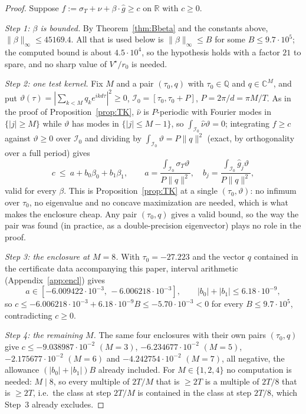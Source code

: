 \documentclass[11pt]{amsart}
\theoremstyle{definition}
\theoremstyle{remark}
\newcommand{\C}{\mathbb C}
\newcommand{\R}{\mathbb R}
\newcommand{\Q}{\mathbb Q}
\newcommand{\sT}{\sigma_T}
\newcommand{\gh}[1]{\widehat g_{#1}}
\newcommand{\nuh}{\widehat\nu}
\begin{document}
\begin{proof}
Suppose $f:=\sT+\nuh+\beta\cdot\widehat g\ge c$ on $\R$ with $c\ge0$.

\emph{Step 1: $\beta$ is bounded.} By Theorem~\ref{thm:Bbeta} and the constants above,
$\|\beta\|_\infty\le45169.4$. All that is used below is $\|\beta\|_\infty\le B$ for some
$B\le9.7\cdot10^5$; the computed bound is about $4.5\cdot10^4$, so the hypothesis holds with a
factor $21$ to spare, and no sharp value of $V^\star/r_0$ is needed.

\emph{Step 2: one test kernel.} Fix $M$ and a pair $(\tau_0,q)$ with $\tau_0\in\Q$ and
$q\in\C^M$, and put $\vartheta(\tau)=|\sum_{k<M}q_ke^{ikd\tau}|^2\ge0$, $\mathcal I_0=[\tau_0,\tau_0+P]$,
$P=2\pi/d=\pi M/T$. As in the proof of Proposition~\ref{prop:TK}, $\nuh$ is $P$-periodic with Fourier
modes in $\{|j|\ge M\}$ while $\vartheta$ has modes in $\{|j|\le M-1\}$, so $\int_{\mathcal I_0}\nuh\vartheta=0$;
integrating $f\ge c$ against $\vartheta\ge0$ over $\mathcal I_0$ and dividing by $\int_{\mathcal I_0}\vartheta=P\|q\|^2$ (exact,
by orthogonality over a full period) gives
\[
c\ \le\ a+b_0\beta_0+b_1\beta_1,\qquad a=\frac{\int_{\mathcal I_0}\sT\vartheta}{P\|q\|^2},\quad
b_j=\frac{\int_{\mathcal I_0}\gh j\vartheta}{P\|q\|^2},
\]
valid for every $\beta$. This is Proposition~\ref{prop:TK} at a single $(\tau_0,\vartheta)$: no
infimum over $\tau_0$, no eigenvalue and no concave maximization are needed, which is what makes the
enclosure cheap. Any pair $(\tau_0,q)$ gives a valid bound, so the way the pair was found (in
practice, as a double-precision eigenvector) plays no role in the proof.

\emph{Step 3: the enclosure at $M=8$.} With $\tau_0=-27.223$ and the vector $q$ contained in the
certificate data accompanying this paper, interval arithmetic (Appendix~\ref{app:encl}) gives
\[
a\in[-6.009422\cdot10^{-3},\,-6.006218\cdot10^{-3}],\qquad |b_0|+|b_1|\le6.18\cdot10^{-9},
\]
so $c\le-6.006218\cdot10^{-3}+6.18\cdot10^{-9}B\le-5.70\cdot10^{-3}<0$ for every $B\le9.7\cdot10^5$,
contradicting $c\ge0$.

\emph{Step 4: the remaining $M$.} The same four enclosures with their own pairs $(\tau_0,q)$ give
$c\le-9.038987\cdot10^{-2}$ $(M=3)$, $-6.234677\cdot10^{-2}$ $(M=5)$, $-2.175677\cdot10^{-2}$ $(M=6)$
and $-4.242754\cdot10^{-2}$ $(M=7)$, all negative, the allowance $(|b_0|+|b_1|)B$ already included.
For $M\in\{1,2,4\}$ no computation is needed: $M\mid8$, so every multiple of $2T/M$ that is $\ge2T$ is
a multiple of $2T/8$ that is $\ge2T$, i.e.\ the class at step $2T/M$ is contained in the class at step
$2T/8$, which Step~3 already excludes.
\end{proof}
\end{document}

